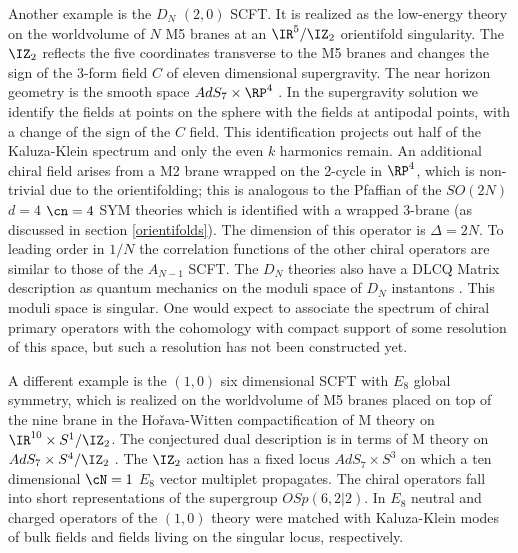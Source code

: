 Another example is the $D_N$ $(2,0)$ SCFT.  It is realized as the
low-energy theory on the worldvolume of $N$ M5 branes at an
$\IR^5/\IZ_2$ orientifold singularity.  The $\IZ_2$ reflects the five
coordinates transverse to the M5 branes and changes the sign of the
3-form field $C$ of eleven dimensional supergravity.  The near horizon
geometry is the smooth space $AdS_7
\times \RP^4$ \cite{Aharony:1998mt}.  
In the supergravity solution we identify the fields at points on the
sphere with the fields at antipodal points, with a change of the sign
of the $C$ field.  This identification projects out half of the
Kaluza-Klein spectrum and only the even $k$ harmonics remain.  An
additional chiral field arises from a M2 brane wrapped on the
2-cycle in $\RP^4$, which is non-trivial due to the orientifolding;
this is analogous to the Pfaffian of the $SO(2N)$ $d=4$ $\cn=4$ SYM
theories which is identified with a wrapped 3-brane
\cite{Witten:1998xy} (as discussed in section \ref{orientifolds}). The
dimension of this operator is $\Delta=2N$. To leading order in $1/N$
the correlation functions of the other chiral operators are similar to
those of the $A_{N-1}$ SCFT.  The $D_N$ theories also have a DLCQ
Matrix description as quantum mechanics on the moduli space of $D_N$
instantons \cite{Aharony:1997md}. This moduli space is singular.  One
would expect to associate the spectrum of chiral primary operators
with the cohomology with compact support of some resolution of this
space, but such a resolution has not been constructed yet.

A different example is the $(1,0)$ six dimensional SCFT with
$E_8$ global symmetry, which is realized on the worldvolume of M5 branes
placed on top of the nine brane in the Ho\v rava-Witten
\cite{Horava:1996qa} compactification of M theory on $\IR^{10} \times
S^1/\IZ_2$.  The conjectured dual description is in terms of M theory on
$AdS_7 \times S^4/\IZ_2$ \cite{Berkooz:1998as}.  The $\IZ_2$ action has a
fixed locus $AdS_7 \times S^3$ on which a ten dimensional $\cN=1$
$E_8$ vector multiplet propagates.
The chiral operators fall into short representations of the supergroup
$OSp(6,2|2)$. In \cite{Gimon:1999to} $E_8$ neutral and charged
operators of the $(1,0)$ theory were matched with Kaluza-Klein modes
of bulk fields and fields living on the singular locus, respectively.


